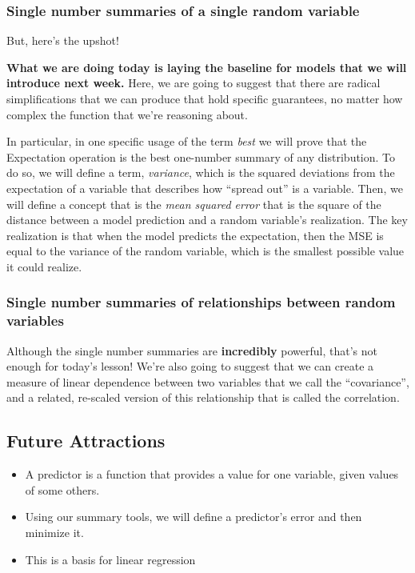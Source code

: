 \documentclass[
  letterpaper,
  DIV=11,
  numbers=noendperiod]{scrreprt}
\providecommand{\tightlist}{%
  \setlength{\itemsep}{0pt}\setlength{\parskip}{0pt}}\usepackage{longtable,booktabs,array}
\begin{document}
\subsubsection{Single number summaries of a single random
variable}\label{single-number-summaries-of-a-single-random-variable}

But, here's the upshot!

\textbf{What we are doing today is laying the baseline for models that
we will introduce next week.} Here, we are going to suggest that there
are radical simplifications that we can produce that hold specific
guarantees, no matter how complex the function that we're reasoning
about.

In particular, in one specific usage of the term \emph{best} we will
prove that the Expectation operation is the best one-number summary of
any distribution. To do so, we will define a term, \emph{variance},
which is the squared deviations from the expectation of a variable that
describes how ``spread out'' is a variable. Then, we will define a
concept that is the \emph{mean squared error} that is the square of the
distance between a model prediction and a random variable's realization.
The key realization is that when the model predicts the expectation,
then the MSE is equal to the variance of the random variable, which is
the smallest possible value it could realize.

\subsubsection{Single number summaries of relationships between random
variables}\label{single-number-summaries-of-relationships-between-random-variables}

Although the single number summaries are \textbf{incredibly} powerful,
that's not enough for today's lesson! We're also going to suggest that
we can create a measure of linear dependence between two variables that
we call the ``covariance'', and a related, re-scaled version of this
relationship that is called the correlation.

\subsection{Future Attractions}\label{future-attractions}

\begin{itemize}
\tightlist
\item
  A predictor is a function that provides a value for one variable,
  given values of some others.
\item
  Using our summary tools, we will define a predictor's error and then
  minimize it.
\item
  This is a basis for linear regression
\end{itemize}
\end{document}

